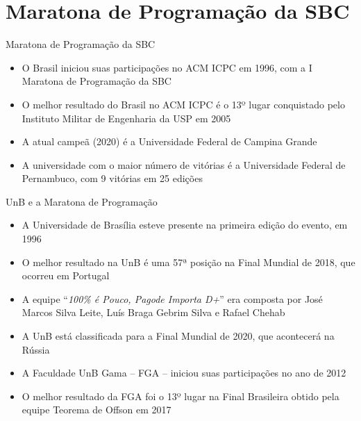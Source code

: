 \section{Maratona de Programação da SBC}

\begin{frame}[fragile]{Maratona de Programação da SBC}

    \begin{itemize}
        \item O Brasil iniciou suas participações no ACM ICPC em 1996, com a I Maratona de
            Programação da SBC
        \item O melhor resultado do Brasil no ACM ICPC é o 13º lugar conquistado pelo 
            Instituto Militar de Engenharia da USP em 2005
        \item A atual campeã (2020) é a Universidade Federal de Campina Grande
        \item A universidade com o maior número de vitórias é a Universidade Federal de
            Pernambuco, com 9 vitórias em 25 edições
    \end{itemize}

\end{frame}

\begin{frame}[fragile]{UnB e a Maratona de Programação}

    \begin{itemize}
        \item A Universidade de Brasília esteve presente na primeira edição do evento, em 1996
        \item O melhor resultado na UnB é uma 57ª posição na Final Mundial de 2018, que ocorreu
            em Portugal

        \item A equipe ``\textit{100\% é Pouco, Pagode Importa D+}'' era composta por José Marcos 
            Silva Leite, Luís Braga Gebrim Silva e Rafael Chehab 

        \item A UnB está classificada para a Final Mundial de 2020, que acontecerá na Rússia
        \item A Faculdade UnB Gama -- FGA -- iniciou suas participações no ano de 2012
        \item O melhor resultado da FGA foi o 13º lugar na Final Brasileira obtido pela equipe 
            Teorema de Offson em 2017
    \end{itemize}

\end{frame}
